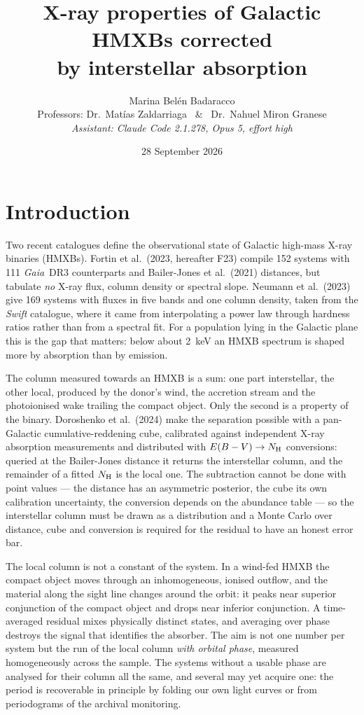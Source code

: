 \documentclass[10pt,a4paper]{article}
\title{\vspace{-1.3cm}\textbf{X-ray properties of Galactic HMXBs corrected\\ by interstellar absorption}}
\author{Marina Belén Badaracco \\[2pt]
\normalsize Professors: Dr.\ Matías Zaldarriaga \ \& \ Dr.\ Nahuel Miron Granese \\[2pt]
\normalsize \textit{Assistant: Claude Code 2.1.278, Opus 5, effort high}}
\date{28 September 2026}
\begin{document}
\maketitle
\vspace{-0.9cm}

\section{Introduction}

Two recent catalogues define the observational state of Galactic high-mass
X-ray binaries (HMXBs). Fortin et al.\ (2023, hereafter F23) compile 152 systems
with 111 \textit{Gaia}~DR3 counterparts and Bailer-Jones et al.\ (2021)
distances, but tabulate \emph{no} X-ray flux, column density or spectral slope.
Neumann et al.\ (2023) give 169 systems with fluxes in five bands and one column
density, taken from the \textit{Swift} catalogue, where it came from
interpolating a power law through hardness ratios rather than from a spectral
fit. For a population lying in the Galactic plane this is the gap that matters:
below about 2~keV an HMXB spectrum is shaped more by absorption than by
emission.

The column measured towards an HMXB is a sum: one part interstellar, the other
local, produced by the donor's wind, the accretion stream and the photoionised
wake trailing the compact object. Only the second is a property of the binary.
Doroshenko et al.\ (2024) make the separation possible with a pan-Galactic
cumulative-reddening cube, calibrated against independent X-ray absorption
measurements and distributed with $E(B-V)\rightarrow N_{\rm H}$ conversions:
queried at the Bailer-Jones distance it returns the interstellar column, and the
remainder of a fitted $N_{\rm H}$ is the local one. The subtraction cannot be
done with point values --- the distance has an asymmetric posterior, the cube its
own calibration uncertainty, the conversion depends on the abundance table ---
so the interstellar column must be drawn as a distribution and a Monte Carlo
over distance, cube and conversion is required for the residual to have an
honest error bar.

The local column is not a constant of the system. In a wind-fed HMXB the compact
object moves through an inhomogeneous, ionised outflow, and the material along
the sight line changes around the orbit: it peaks near superior conjunction of
the compact object and drops near inferior conjunction. A time-averaged residual
mixes physically distinct states, and averaging over phase destroys the signal
that identifies the absorber. The aim is not one number per system but the run
of the local column \emph{with orbital phase}, measured homogeneously across the
sample. The systems without a usable phase are analysed for their column all the same,
and several may yet acquire one: the period is recoverable in principle by
folding our own light curves or from periodograms of the archival monitoring.
\end{document}
